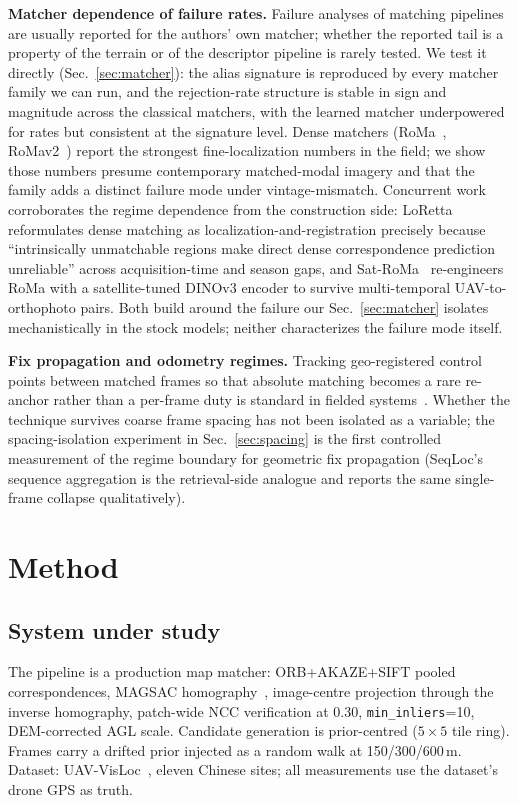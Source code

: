 \documentclass[journal]{IEEEtran}
\begin{document}
\textbf{Matcher dependence of failure rates.} Failure analyses of matching pipelines are usually reported for the authors' own matcher; whether the reported tail is a property of the terrain or of the descriptor pipeline is rarely tested. We test it directly (Sec.~\ref{sec:matcher}): the alias signature is reproduced by every matcher family we can run, and the rejection-rate structure is stable in sign and magnitude across the classical matchers, with the learned matcher underpowered for rates but consistent at the signature level. Dense matchers (RoMa~\cite{roma}, RoMav2~\cite{xianvisloc}) report the strongest fine-localization numbers in the field; we show those numbers presume contemporary matched-modal imagery and that the family adds a distinct failure mode under vintage-mismatch. Concurrent work corroborates the regime dependence from the construction side: LoRetta~\cite{loretta} reformulates dense matching as localization-and-registration precisely because ``intrinsically unmatchable regions make direct dense correspondence prediction unreliable'' across acquisition-time and season gaps, and Sat-RoMa~\cite{satroma} re-engineers RoMa with a satellite-tuned DINOv3 encoder to survive multi-temporal UAV-to-orthophoto pairs. Both build around the failure our Sec.~\ref{sec:matcher} isolates mechanistically in the stock models; neither characterizes the failure mode itself.

\textbf{Fix propagation and odometry regimes.} Tracking geo-registered control points between matched frames so that absolute matching becomes a rare re-anchor rather than a per-frame duty is standard in fielded systems~\cite{yao2024,orthotrack}. Whether the technique survives coarse frame spacing has not been isolated as a variable; the spacing-isolation experiment in Sec.~\ref{sec:spacing} is the first controlled measurement of the regime boundary for geometric fix propagation (SeqLoc's sequence aggregation is the retrieval-side analogue and reports the same single-frame collapse qualitatively).

\section{Method}

\subsection{System under study}
The pipeline is a production map matcher: ORB+AKAZE+SIFT pooled correspondences, MAGSAC homography~\cite{magsac}, image-centre projection through the inverse homography, patch-wide NCC verification at 0.30, \texttt{min\_inliers}=10, DEM-corrected AGL scale. Candidate generation is prior-centred ($5\times5$ tile ring). Frames carry a drifted prior injected as a random walk at 150/300/600\,m. Dataset: UAV-VisLoc~\cite{uavvisloc}, eleven Chinese sites; all measurements use the dataset's drone GPS as truth.
\end{document}
